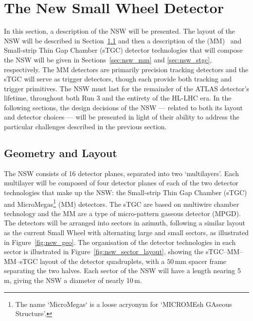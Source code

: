 \section{The New Small Wheel Detector}
\label{sec:nsw_detector}

In this section, a description of the NSW will be presented.
The layout of the NSW will be described in Section~\ref{sec:nsw_geo}
and then a description of the \micromegas (MM)~\cite{Giomataris:1995fq} and Small-strip Thin Gap Chamber (sTGC)
detector technologies that will compose the NSW
will be given in Sections~\ref{sec:nsw_mm} and \ref{sec:nsw_stgc}, respectively.
The MM detectors are primarily precision tracking detectors and the sTGC
will serve as trigger detectors, though each provide both tracking and trigger primitives.
The NSW must last for the remainder of the ATLAS detector's lifetime, throughout
both Run 3 and the entirety of the HL-LHC era.
In the following sections, the design decisions of the NSW --- related to both its layout 
and detector choices --- will be presented in light of their ability to address
the particular challenges described in the previous section.

\subsection{Geometry and Layout}
\label{sec:nsw_geo}

The NSW consists of 16 detector planes, separated into two `multilayers'.
Each multilayer will be composed of four detector planes of each of the two
detector technologies that make up the NSW: the Small-strip Thin Gap Chamber (sTGC)
and MicroMegas\footnote{The name `MicroMegas` is a loose acryonym for `MICROMEsh GAseous Structure'.} (MM)
detectors.
The sTGC are based on multiwire chamber technology and the MM are a type of
micro-pattern gaseous detector (MPGD).
The detectors will be arranged into sectors in azimuth, following a similar layout
as the current Small Wheel with alternating large and small sectors, as illustrated in Figure~\ref{fig:nsw_geo}.
The organisation of the detector technologies in each sector is illustrated in Figure~\ref{fig:nsw_sector_layout},
showing the sTGC--MM--MM--sTGC layout of the detector quadruplets, with a $50$\,mm spacer
frame separating the two halves.
Each sector of the NSW will have a length nearing 5\,m, giving the NSW a diameter of
nearly 10\,m.

